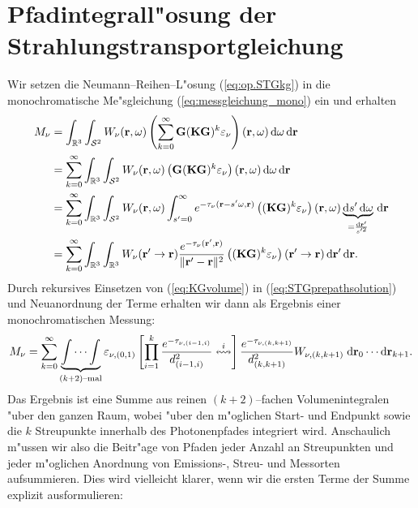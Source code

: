 	\section{Pfadintegrall"osung der Strahlungstransportgleichung}
	Wir setzen die Neumann--Reihen--L"osung (\ref{eq:op.STGkg}) in die monochromatische Me"sgleichung (\ref{eq:messgleichung_mono}) ein und erhalten
	\begin{align}
		M_\nu&=\int_{\mathbb{R}^3}\int_{\mathcal{S}^2}W_\nu(\mathbf{r},\omega) \left(\sum_{k=0}^\infty \mathbf{G} (\mathbf{KG})^k \varepsilon_\nu\right)(\mathbf{r},\omega) \,\text{d}\omega \,\text{d}\mathbf{r} \nonumber \\
		&=\sum_{k=0}^\infty \int_{\mathbb{R}^3}\int_{\mathcal{S}^2}W_\nu(\mathbf{r},\omega) \left(\mathbf{G} (\mathbf{KG})^k \varepsilon_\nu\right)(\mathbf{r},\omega) \,\text{d}\omega \,\text{d}\mathbf{r} \nonumber \\
		&=\sum_{k=0}^\infty \int_{\mathbb{R}^3}\int_{\mathcal{S}^2}W_\nu(\mathbf{r},\omega) \int_{s'=0}^\infty e^{-\tau_\nu(\mathbf{r}-s' \omega,\mathbf{r})} \left((\mathbf{KG})^k \varepsilon_\nu\right)(\mathbf{r},\omega) \underbrace{\text{d}s' \,\text{d}\omega}_{=\frac{\text{d}\mathbf{r}'}{s'^2}} \,\text{d}\mathbf{r} \nonumber \\
		&=\sum_{k=0}^\infty \int_{\mathbb{R}^3}\int_{\mathbb{R}^3}W_\nu(\mathbf{r}'\rightarrow\mathbf{r}) \frac{e^{-\tau_\nu(\mathbf{r}',\mathbf{r})}}{\|\mathbf{r}'-\mathbf{r}\|^2} \left((\mathbf{KG})^k \varepsilon_\nu\right)(\mathbf{r}'\rightarrow\mathbf{r}) \,\text{d}\mathbf{r}' \,\text{d}\mathbf{r}.
		\label{eq:STGprepathsolution}
	\end{align}
	Durch rekursives Einsetzen von (\ref{eq:KGvolume}) in (\ref{eq:STGprepathsolution}) und Neuanordnung der Terme erhalten wir dann als Ergebnis einer monochromatischen Messung:
	\begin{equation}
		M_\nu=\sum_{k=0}^\infty \underbrace{\idotsint}_{(k+2)\text{--mal}}\varepsilon_{\nu,(0,1)}\left[\prod_{i=1}^k\frac{e^{-\tau_{\nu,(i-1,i)}}}{d_{(i-1,i)}^2}\overset{i}{\leftrightsquigarrow}\right]\frac{e^{-\tau_{\nu,(k,k+1)}}}{d_{(k,k+1)}^2} W_{\nu,(k,k+1)} \;\text{d}\mathbf{r}_0 \dotsm \text{d}\mathbf{r}_{k+1} .
		\label{eq:STGpathsolution}
	\end{equation}
	Das Ergebnis ist eine Summe aus reinen $(k+2)$--fachen Volumenintegralen "uber den ganzen Raum, wobei "uber den m"oglichen Start- und Endpunkt sowie die $k$ Streupunkte innerhalb des Photonenpfades integriert wird.
	Anschaulich m"ussen wir also die Beitr"age von Pfaden jeder Anzahl an Streupunkten und jeder m"oglichen Anordnung von Emissions-, Streu- und Mess\-orten aufsummieren. Dies wird vielleicht klarer, wenn wir die ersten Terme der Summe explizit ausformulieren:
